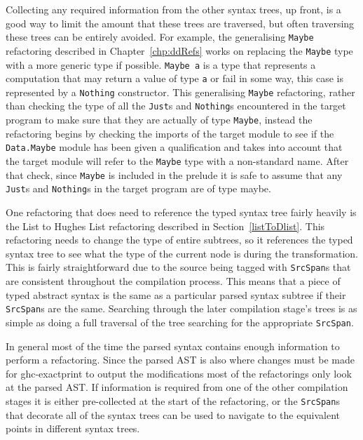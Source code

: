 Collecting any required information from the other syntax trees, up front, is a good way to limit the amount that these trees are traversed, but often traversing these trees can be entirely avoided. For example, the generalising \texttt{Maybe} refactoring described in Chapter~\ref{chp:ddRefs} works on replacing the \texttt{Maybe} type with a more generic type if possible. \texttt{Maybe a} is a type that represents a computation that may return a value of type \texttt{a} or fail in some way, this case is represented by a \texttt{Nothing} constructor. This generalising \texttt{Maybe} refactoring, rather than checking the type of all the \texttt{Just}s and \texttt{Nothing}s encountered in the target program to make sure that they are actually of type \texttt{Maybe}, instead the refactoring begins by checking the imports of the target module to see if the \texttt{Data.Maybe} module has been given a qualification and takes into account that the target module will refer to the \texttt{Maybe} type with a non-standard name. After that check, since \texttt{Maybe} is included in the prelude it is safe to assume that any \texttt{Just}s and \texttt{Nothing}s in the target program are of type maybe.

One refactoring that does need to reference the typed syntax tree fairly heavily is the List to Hughes List refactoring described in Section~\ref{listToDlist}. This refactoring needs to change the type of entire subtrees, so it references the typed syntax tree to see what the type of the current node is during the transformation. This is fairly straightforward due to the source being tagged with \texttt{SrcSpan}s that are consistent throughout the compilation process. This means that a piece of typed abstract syntax is the same as a particular parsed syntax subtree if their \texttt{SrcSpan}s are the same. Searching through the later compilation stage's trees is as simple as doing a full traversal of the tree searching for the appropriate \texttt{SrcSpan}. 

In general most of the time the parsed syntax contains enough information to perform a refactoring. Since the parsed AST is also where changes must be made for ghc-exactprint to output the modifications most of the refactorings only look at the parsed AST. If information is required from one of the other compilation stages it is either pre-collected at the start of the refactoring, or the \texttt{SrcSpan}s that decorate all of the syntax trees can be used to navigate to the equivalent points in different syntax trees.



